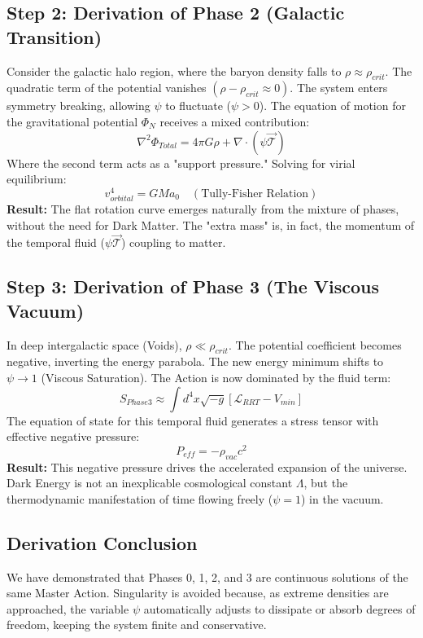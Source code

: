 \documentclass[10pt, a4paper]{article}
\begin{document}
\subsection{Step 2: Derivation of Phase 2 (Galactic Transition)}
Consider the galactic halo region, where the baryon density falls to $\rho \approx \rho_{crit}$.
The quadratic term of the potential vanishes $(\rho - \rho_{crit} \approx 0)$. The system enters symmetry breaking, allowing $\psi$ to fluctuate ($\psi > 0$).
The equation of motion for the gravitational potential $\Phi_N$ receives a mixed contribution:
\begin{equation}
\nabla^2 \Phi_{Total} = 4\pi G \rho + \nabla \cdot (\psi \vec{\mathcal{T}})
\end{equation}
Where the second term acts as a "support pressure." Solving for virial equilibrium:
\begin{equation}
v_{orbital}^4 = G M a_0 \quad (\text{Tully-Fisher Relation})
\end{equation}
\textbf{Result:} The flat rotation curve emerges naturally from the mixture of phases, without the need for Dark Matter. The "extra mass" is, in fact, the momentum of the temporal fluid ($\psi \vec{\mathcal{T}}$) coupling to matter.

\subsection{Step 3: Derivation of Phase 3 (The Viscous Vacuum)}
In deep intergalactic space (Voids), $\rho \ll \rho_{crit}$. The potential coefficient becomes negative, inverting the energy parabola. The new energy minimum shifts to $\psi \to 1$ (Viscous Saturation).
The Action is now dominated by the fluid term:
\begin{equation}
S_{Phase 3} \approx \int d^4x \sqrt{-g} \left[ \mathcal{L}_{RRT} - V_{min} \right]
\end{equation}
The equation of state for this temporal fluid generates a stress tensor with effective negative pressure:
\begin{equation}
P_{eff} = -\rho_{vac} c^2
\end{equation}
\textbf{Result:} This negative pressure drives the accelerated expansion of the universe. Dark Energy is not an inexplicable cosmological constant $\Lambda$, but the thermodynamic manifestation of time flowing freely ($\psi=1$) in the vacuum.

\subsection{Derivation Conclusion}
We have demonstrated that Phases 0, 1, 2, and 3 are continuous solutions of the same Master Action. Singularity is avoided because, as extreme densities are approached, the variable $\psi$ automatically adjusts to dissipate or absorb degrees of freedom, keeping the system finite and conservative.
\end{document}
